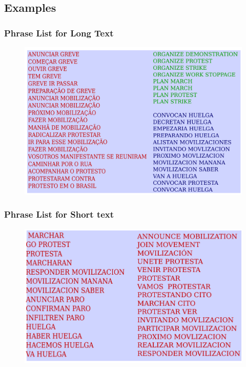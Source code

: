 \documentclass[red]{beamer}
\begin{document}
\subsection{Examples}
\begin{frame}
    \frametitle{Phrase List for Long Text}
    \begin{figure}
        \includegraphics[scale=0.5]{wordlist_rss}
    \end{figure}
\end{frame}


\begin{frame}
    \frametitle{Phrase List for Short text}
     \begin{figure}
        \includegraphics[scale=0.5]{wordlist_twitter}
     \end{figure}
\end{frame}
\end{document}
